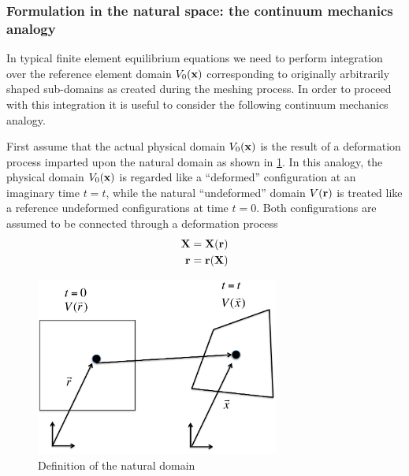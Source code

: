 \subsubsection{Formulation in the natural space: the continuum mechanics analogy}
In typical finite element equilibrium equations we need to perform integration over the reference element domain $V_0(\vb{x})$ corresponding to originally arbitrarily shaped sub-domains as created during the meshing process.  In order to proceed with this integration it is useful to consider the following continuum mechanics analogy.

First assume that the actual physical domain $V_0(\vb{x})$ is the result of a deformation process imparted upon the natural domain as shown in \cref{fig:natural domain}. In this analogy, the physical domain $V_0(\vb{x})$ is regarded like a ``deformed'' configuration at an imaginary time $t=t$, while the natural ``undeformed'' domain $V(\vb{r})$   is treated like a reference undeformed configurations at time $t=0$. Both configurations are assumed to be connected through a deformation process
\begin{equation}
\begin{aligned}
\vb{X}&=\vb{X}(\vb{r})\\
\vb{r}&=\vb{r}(\vb{X})
\end{aligned}
\label{eq:motion}
\end{equation}
\begin{figure}[h]
\centering
\includegraphics[width=8cm]{figure1.pdf}
\caption{Definition of the natural domain}
\label{fig:natural domain}
\end{figure} 

